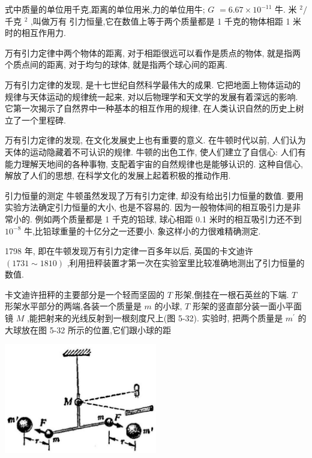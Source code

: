 \documentclass[10pt]{article}
\begin{document}
式中质量的单位用千克,距离的单位用米,力的单位用牛; \(G\) \(= {6.67} \times {10}^{-{11}}\) 牛. 米 \({}^{2}/\) 千克 \({}^{2}\) ,叫做万有 引力恒量,它在数值上等于两个质量都是 1 千克的物体相距 1 米时的相互作用力.

万有引力定律中两个物体的距离, 对于相距很远可以看作是质点的物体, 就是指两个质点间的距离, 对于均匀的球体, 就是指两个球心间的距离.

万有引力定律的发现, 是十七世纪自然科学最伟大的成果. 它把地面上物体运动的规律与天体运动的规律统一起来, 对以后物理学和天文学的发展有着深远的影响. 它第一次揭示了自然界中一种基本的相互作用的规律, 在人类认识自然的历史上树立了一个里程碑.

万有引力定律的发现, 在文化发展史上也有重要的意义. 在牛顿时代以前, 人们认为天体的运动隐藏着不可认识的规律. 牛顿的出色工作, 使人们建立了自信心: 人们有能力理解天地间的各种事物, 支配着宇宙的自然规律也是能够认识的. 这种自信心, 解放了人们的思想, 在科学文化的发展上起着积极的推动作用.

引力恒量的测定 牛顿虽然发现了万有引力定律, 却没有给出引力恒量的数值. 要用实验方法确定引力恒量的大小, 也是不容易的. 因为一般物体间的相互吸引力是非常小的. 例如两个质量都是 1 千克的铅球, 球心相距 0.1 米时的相互吸引力还不到 \({10}^{-8}\) 牛,比铅球重量的十亿分之一还要小. 象这样小的力很难精确测定.

1798 年, 即在牛顿发现万有引力定律一百多年以后, 英国的卡文迪许 \(\left( {{1731} \sim {1810}}\right)\) ,利用扭秤装置才第一次在实验室里比较准确地测出了引力恒量的数值.

卡文迪许扭秤的主要部分是一个轻而坚固的 \(T\) 形架,倒挂在一根石英丝的下端. \(T\) 形架水平部分的两端,各装一个质量是 \(m\) 的小球, \(T\) 形架的竖直部分装一面小平面镜 \(M\) ,能把射来的光线反射到一根刻度尺上(图 5-32). 实验时, 把两个质量是 \({m}^{\prime }\) 的大球放在图 5-32 所示的位置,它们跟小球的距

\begin{center}
\includegraphics[max width=0.5\textwidth]{images/01912d55-147c-70aa-b0e0-1782a122f948_157_161176.jpg}
\end{center}
\end{document}
